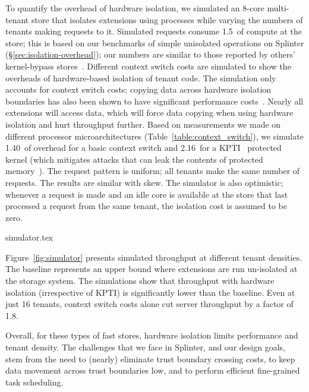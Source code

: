 To quantify the overhead of hardware isolation, we simulated an
  8-core multi-tenant store that isolates extensions using
  processes while varying the numbers of tenants making requests to it.
Simulated requests consume 1.5~\us of compute at the store; this
  is based on our benchmarks of simple unisolated operations on Splinter
  (\S\ref{sec:isolation-overhead}); our numbers are similar to those reported
  by others' kernel-bypass stores~\cite{ramcloud}.
Different context switch costs are simulated to show the
  overheads of hardware-based isolation of tenant code.
The simulation only accounts for context switch costs;
copying data across hardware isolation boundaries has also been shown to have
  significant performance costs~\cite{netbricks-2016}.
Nearly all extensions will access data, which will force data copying
  when using hardware isolation and hurt throughput further.
Based on measurements we made on different processor microarchitectures
  (Table~\ref{table:context_switch}), we simulate
  1.40~\us of overhead for a basic context switch and 2.16~\us for a
  KPTI~\cite{kpti-2018} protected kernel (which mitigates attacks
  that can leak the contents of protected memory~\cite{meltdown-2018}).
The request pattern is uniform;
all tenants make the same number of requests. The results are similar
  with skew.
The simulator is also optimistic; whenever a request is made and an idle core
  is available at the store that last processed a request from the same tenant,
  the isolation cost is assumed to be zero.

 {simulator.tex}

Figure~\ref{fig:simulator} presents simulated throughput at different
tenant densities. The baseline represents an upper bound where
extensions are run un-isolated at the storage system. The simulations
show that throughput with hardware isolation (irrespective of KPTI) is
significantly lower than the baseline. Even at just 16 tenants, context
switch costs alone cut server throughput by a factor of 1.8.

Overall, for these types of fast stores, hardware isolation limits performance
  and tenant density.
The challenges that we face in Splinter, and our design goals, stem from
    the need to (nearly)
  eliminate trust boundary crossing costs, to keep data movement across trust
  boundaries low, and to perform efficient fine-grained task scheduling.

